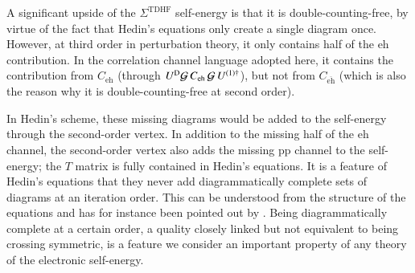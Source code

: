 \documentclass[aip,jcp,reprint,noshowkeys,superscriptaddress]{revtex4-1}
\newcommand{\eh}{\text{eh}}
\newcommand{\teh}{\overline{\text{eh}}}
\newcommand{\pp}{\text{pp}}
\begin{document}
A significant upside of the $\Sigma^{\text{TDHF}}$ self-energy is that it is 
double-counting-free, by virtue of the fact that Hedin's equations only create 
a single diagram once. However, at third order in perturbation theory, it only 
contains half of the $\eh$ contribution. 
In the correlation channel language adopted here, it contains 
the contribution from $C_{\eh}$
(through $U^{\rm D}\mathcal G\,C_{\eh}\,\mathcal G\,U^{(1)\dagger}$), but not from $C_{\teh}$
(which is also the reason why it is double-counting-free at second order).

In Hedin's scheme, these missing diagrams would be added to the self-energy 
through the second-order vertex. In addition to the missing half of the 
$\eh$ channel, the second-order vertex also adds the missing $\pp$ channel
to the self-energy; the $T$ matrix is fully contained in Hedin's
equations.\cite{MejutoZaera2022} It is a feature of Hedin's equations
that they never add diagrammatically complete sets of diagrams at an
iteration order. This can be understood from the structure of the equations
and has for instance been pointed out by \citet{Schindlmayr1998}.
Being diagrammatically complete at a certain order, a quality closely linked 
but not equivalent to being crossing symmetric, is a feature we consider an important property 
of any theory of the electronic self-energy.
\end{document}
